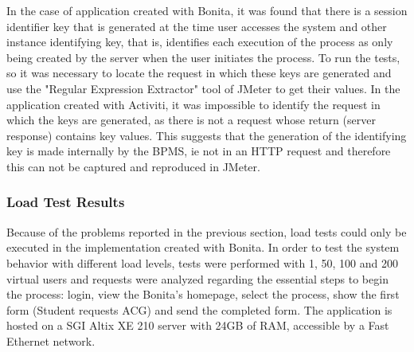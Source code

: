 \documentclass[runningheads,a4paper]{llncs}
\begin{document}
{%
In the case of application created with Bonita, it was found that there is a session identifier key that is generated at the time user accesses the system and other instance identifying key, that is, identifies each execution of the process as only being created by the server when the user initiates the process. To run the tests, so it was necessary to locate the request in which these keys are generated and use the "Regular Expression Extractor" tool of JMeter to get their values. In the application created with Activiti, it was impossible to identify the request in which the keys are generated, as there is not a request whose return (server response) contains key values. This suggests that the generation of the identifying key is made internally by the BPMS, ie not in an HTTP request and therefore this can not be captured and reproduced in JMeter.

\subsubsection{Load Test Results}

Because of the problems reported in the previous section, load tests could only be executed in the implementation created with Bonita. In order to test the system behavior with different load levels, tests were performed with 1, 50, 100 and 200 virtual users and requests were analyzed regarding the essential steps to begin the process: login, view the Bonita's homepage, select the process, show the first form (Student requests ACG) and send the completed form. The application is hosted on a SGI Altix XE 210 server with 24GB of RAM, accessible by a Fast Ethernet network.

}
\end{document}
